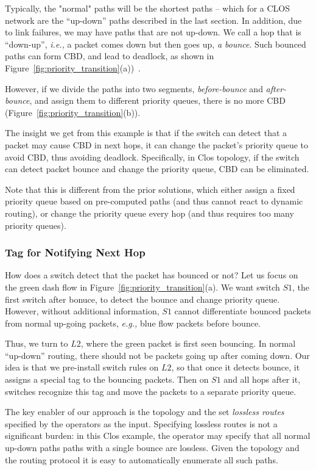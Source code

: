 Typically, the "normal" paths will be the shortest paths -- which for a CLOS
network are the ``up-down'' paths described in the last section.  In addition,
due to link failures, we may have paths that are not up-down. We call a hop that
is ``down-up'', {\em i.e.,} a packet comes down but then goes up, {\em a bounce}.
Such bounced paths can form CBD, and lead to deadlock, as shown in
Figure~\ref{fig:priority_transition}(a))~\cite{shpiner2016unlocking}. 

However, if we divide the paths into two segments, {\em before-bounce} and {\em
after-bounce}, and assign them to different priority queues, there is no more
CBD (Figure~\ref{fig:priority_transition}(b)). 

 The insight we get from this
example is that if the switch can detect that a packet may cause CBD in next
hops, it can change the packet's priority queue to avoid CBD, thus avoiding deadlock.
Specifically, in Clos topology, if the switch can detect packet bounce and change 
the priority queue, CBD can be eliminated.

Note that this is different from the prior solutions, which either assign a
fixed priority queue based on pre-computed paths (and thus cannot react to dynamic
routing), or change the priority queue every hop (and thus requires too many priority
queues). 

\subsubsection{Tag for Notifying Next Hop}

How does a switch detect that the packet has bounced or not? Let us focus on the
green dash flow in Figure~\ref{fig:priority_transition}(a). We want switch $S1$, 
the first switch after bonuce, to detect the bounce and change priority queue. However, 
without additional information, $S1$ cannot differentiate bounced packets from normal 
up-going packets, {\em e.g.,} blue flow packets before bounce. 

Thus, we turn to $L2$, where the green packet is first seen bouncing. In normal
``up-down'' routing, there should not be packets going up after coming down. Our
idea is that we pre-install switch rules on $L2$, so that once it detects bounce, it 
assigns a special tag to the bouncing packets. Then on $S1$ and all hops after it,
switches recognize this tag and move the packets to a separate priority queue.

The key enabler of our approach is the topology and the set {\em lossless
routes} specified by the operators as the input. Specifying lossless routes is
not a significant burden: in this Clos example, the operator may specify that all
normal up-down paths paths with a single bounce are lossless. Given the
topology and the routing protocol it is easy to automatically enumerate all such
paths. 


